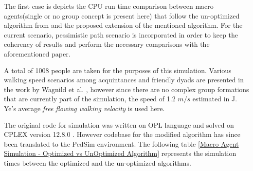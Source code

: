The first case is depicts the CPU run time comparison between macro agents(single or no group concept is present here) that follow the un-optimized algorithm from \cite{ref5} and the proposed extension of the mentioned algorithm. For the current scenario, pessimistic path scenario is incorporated in order to keep the coherency of results and perform the necessary comparisons with the aforementioned paper.

A total of 1008 people are taken for the purposes of this simulation. Various walking speed scenarios among acquintances and friendly dyads are presented in the work by Wagnild et al. \cite{ref24}, however since there are no complex group formations that are currently part of the simulation, the speed of 1.2 $m/s$ estimated in J. Ye's average \textit{free flowing walking velocity} \cite{ref25} is used here.

The original code for simulation was written on OPL language and solved on CPLEX version 12.8.0 \cite{ref5}. However codebase for the modified algorithm has since been translated to the PedSim environment. The following table \ref{Macro Agent Simulation - Optimized vs UnOptimized Algorithm} represents the simulation times between the optimized and the un-optimized algorithms.
 

